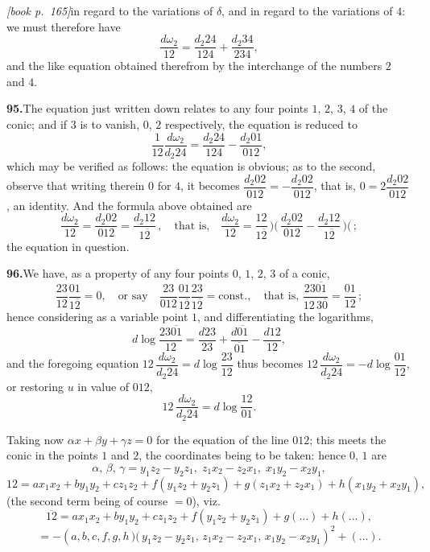 \documentclass[11pt,a4paper]{article}
\begin{document}
\medskip\noindent\textit{[book p.~165]}\quad in regard to the variations of $\delta$, and in regard to the variations of $4$: we must therefore have
\[
\frac{d\omega_2}{12} = \frac{d_2 24}{124} + \frac{d_2 34}{234},
\]
and the like equation obtained therefrom by the interchange of the numbers $2$ and $4$.

\medskip\noindent\textbf{95.}\quad The equation just written down relates to any four points $1$, $2$, $3$, $4$ of the conic; and if $3$ is to vanish, $0$, $2$ respectively, the equation is reduced to
\[
\frac{1}{12}\frac{d\omega_2}{d_2 24} = \frac{d_2 24}{124} - \frac{d_2 01}{012},
\]
which may be verified as follows: the equation is obvious; as to the second, observe that writing therein $0$ for $4$, it becomes $\dfrac{d_2 02}{012} = -\dfrac{d_2 02}{012}$, that is, $0 = 2\dfrac{d_2 02}{012}$, an identity. And the formula above obtained are
\[
\frac{d\omega_2}{12} = \frac{d_2 02}{012} = \frac{d_2 12}{1\overline{2}}\,,\quad\text{that is,}\quad \frac{d\omega_2}{12} = \frac{12}{1\overline{2}}\!\,\mbox{$)\!($}\,\frac{d_2 02}{012} - \frac{d_2 12}{1\overline{2}}\!\,\mbox{$)\!($}\,;
\]
the equation in question.

\medskip\noindent\textbf{96.}\quad We have, as a property of any four points $0$, $1$, $2$, $3$ of a conic,
\[
\frac{23}{12}\frac{01}{1\overline{2}} = 0,\quad\text{or say}\quad \frac{23}{012}\frac{01}{1\overline{2}}\frac{23}{1\overline{2}} = \text{const.},\quad\text{that is, }\frac{23\overline{01}}{12\,3\overline{0}} = \frac{01}{12}\,;
\]
hence considering as a variable point $1$, and differentiating the logarithms,
\[
d\log\frac{23\overline{01}}{12} = \frac{d23}{23} + \frac{d\overline{01}}{\overline{01}} - \frac{d12}{12},
\]
and the foregoing equation $12\,\dfrac{d\omega_2}{d_2 24} = d\log\dfrac{23}{12}$ thus becomes $12\,\dfrac{d\omega_2}{d_2 24} = -d\log\dfrac{01}{12}$, or restoring $u$ in value of $012$,
\[
12\,\frac{d\omega_2}{d_2 24} = d\log\frac{12}{01}.
\]

Taking now $\alpha x + \beta y + \gamma z = 0$ for the equation of the line $012$; this meets the conic in the points $1$ and $2$, the coordinates being to be taken: hence $0$, $1$ are
\[
\alpha,\,\beta,\,\gamma = y_1 z_2 - y_2 z_1,\;z_1 x_2 - z_2 x_1,\;x_1 y_2 - x_2 y_1,
\]
\[
12 = a x_1 x_2 + b y_1 y_2 + c z_1 z_2 + f(y_1 z_2 + y_2 z_1) + g(z_1 x_2 + z_2 x_1) + h(x_1 y_2 + x_2 y_1),
\]
(the second term being of course $= 0$), viz.
\[
\overline{12} = a x_1 x_2 + b y_1 y_2 + c z_1 z_2 + f(y_1 z_2 + y_2 z_1) + g(\ldots) + h(\ldots),
\]
\[
= -(a, b, c, f, g, h\,\mbox{$)\!($}\,y_1 z_2 - y_2 z_1,\,z_1 x_2 - z_2 x_1,\,x_1 y_2 - x_2 y_1)^2 + (\ldots).
\]
\end{document}
